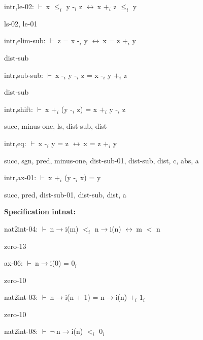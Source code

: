 \documentclass[a4paper]{article}
\newcommand{\Fol}{\mbox{$\vdash\ $}}
\newcommand{\Not}{\mbox{$\neg\ $}}
\newcommand{\Equiv}{\mbox{$\leftrightarrow\ $}}
\begin{document}
\bigskip

intr,le-02: 
 \Fol x $\mbox{$\le$}_{i}$ y $\mbox{-}_{i}$ z \Equiv x $\mbox{+}_{i}$ z $\mbox{$\le$}_{i}$ y



ls-02, le-01

\bigskip

intr,elim-sub: 
 \Fol z = x $\mbox{-}_{i}$ y \Equiv x = z $\mbox{+}_{i}$ y



dist-sub

\bigskip

intr,sub-sub: 
 \Fol x $\mbox{-}_{i}$ y $\mbox{-}_{i}$ z = x $\mbox{-}_{i}$ y $\mbox{+}_{i}$ z



dist-sub

\bigskip

intr,shift: 
 \Fol x $\mbox{+}_{i}$ (y $\mbox{-}_{i}$ z) = x $\mbox{+}_{i}$ y $\mbox{-}_{i}$ z



succ, minus-one, ls, dist-sub, dist

\bigskip

intr,eq: 
 \Fol x $\mbox{-}_{i}$ y = z \Equiv x = z $\mbox{+}_{i}$ y



succ, sgn, pred, minus-one, dist-sub-01, dist-sub, dist, c, abs, a

\bigskip

intr,ax-01: 
 \Fol x $\mbox{+}_{i}$ (y $\mbox{-}_{i}$ x) = y



succ, pred, dist-sub-01, dist-sub, dist, a

\bigskip

{\bf Specification intnat:}

nat2int-04: 
 \Fol n$\to$i(m) $\mbox{$<$}_{i}$ n$\to$i(n) \Equiv m $<$ n



zero-13

\bigskip

ax-06: 
 \Fol n$\to$i(0) = $\mbox{0}_{i}$



zero-10

\bigskip

nat2int-03: 
 \Fol n$\to$i(n + 1) = n$\to$i(n) $\mbox{+}_{i}$ $\mbox{1}_{i}$



zero-10

\bigskip

nat2int-08: 
 \Fol \Not n$\to$i(n) $\mbox{$<$}_{i}$ $\mbox{0}_{i}$
\end{document}
